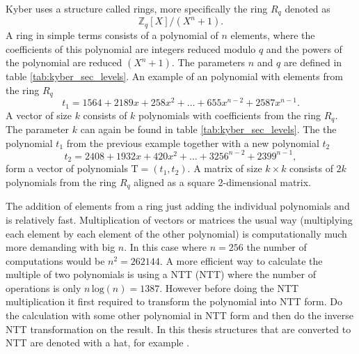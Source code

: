 Kyber uses a structure called rings, more specifically the ring $R_q$ denoted as
\begin{equation}
  \mathbb{Z}_q[X]/(X^n+1).
\end{equation}
A ring in simple terms consists of a polynomial of $n$ elements, where the coefficients of this polynomial are integers reduced modulo $q$ and the powers of the polynomial are reduced $(X^n+1)$. The parameters $n$ and $q$ are defined in table \ref{tab:kyber_sec_levels}. An example of an polynomial with elements from the ring $R_q$
\begin{equation}
  t_1 = 1564 + 2189x + 258x^2 + \dots + 655x^{n-2} + 2587x^{n-1}.
\end{equation}
A vector of size $k$ consists of $k$ polynomials with coefficients from the ring $R_q$. The parameter $k$ can again be found in table \ref{tab:kyber_sec_levels}. The the polynomial $t_1$ from the previous example together with a new polynomial $t_2$
\begin{equation}
  t_2 = 2408 + 1932x + 420x^2 + \dots + 3256^{n-2} + 2399^{n-1},
\end{equation}
form a vector of polynomials $\mathrm{T}=(t_1, t_2)$. A matrix of size $k\times k$ consists of $2k$ polynomials from the ring $R_q$ aligned as a square 2-dimensional matrix. \cite{YbbuGxVPF0GGTxfN}

The addition of elements from a ring just adding the individual polynomials and is relatively fast. Multiplication of vectors or matrices the usual way (multiplying each element by each element of the other polynomial) is computationally much more demanding with big $n$. In this case where $n=256$ the number of computations would be $n^2=262144$. A more efficient way to calculate the multiple of two polynomials is using a NTT (\acl{NTT}) where the number of operations is only $n\,\mathrm{log}(n)=1387$. However before doing the NTT multiplication it first required to transform the polynomial into NTT form. Do the calculation with some other polynomial in NTT form and then do the inverse NTT transformation on the result. In this thesis structures that are converted to NTT are denoted with a hat, for example . \cite{Liang2021}



